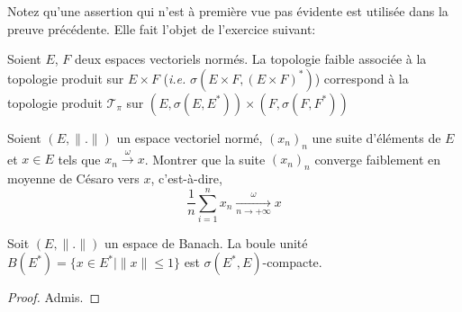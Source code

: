 Notez qu'une assertion qui n'est à première vue pas évidente est utilisée
dans la preuve précédente. Elle fait l'objet de l'exercice suivant:
\begin{exo}
  Soient $E$, $F$ deux espaces vectoriels normés. La topologie faible
  associée à la topologie produit sur $E\times F$ (\emph{i.e.}
  $\sigma\left(E\times F, (E\times F)^*\right)$) correspond à la
  topologie produit $\mathcal{T}_\pi$ sur
  $(E, \sigma(E, E^*))\times (F, \sigma(F, F^*))$
\end{exo}

\begin{exo}
  Soient $(E, \|.\|)$ un espace vectoriel normé, $(x_n)_n$ une suite
  d'éléments de $E$ et $x\in E$ tels que $x_n\xrightarrow{\omega}x$.
  Montrer que la suite $(x_n)_n$ converge faiblement en moyenne
  de Césaro vers $x$, c'est-à-dire,
  \begin{equation*}
    \frac{1}{n}\sum_{i=1}^nx_n\xrightarrow[n\to +\infty]{\omega} x
  \end{equation*}
\end{exo}

\begin{thm}
  Soit $(E, \|.\|)$ un espace de Banach. La boule unité
  $B(E^*)=\{x\in E^*\mid \|x\|\leq 1\}$ est $\sigma(E^*, E)$-compacte.
\end{thm}
\begin{proof}
  Admis.
\end{proof}

